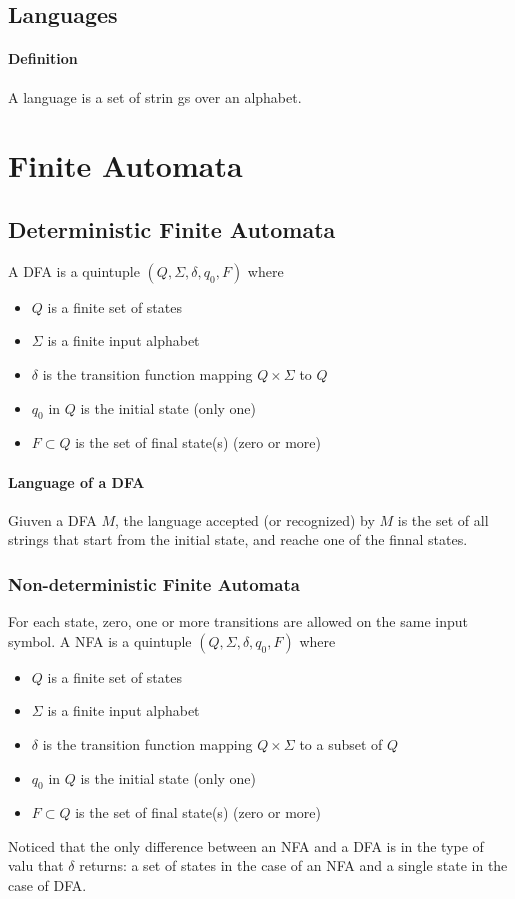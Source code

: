 \documentclass[titlepage]{article}
\begin{document}
        \subsection*{Languages}
            \paragraph{Definition}
            A language is a set of strin gs over an alphabet.
    \section{Finite Automata}
        \subsection*{Deterministic Finite Automata}
            A DFA is a quintuple $(Q,\Sigma,\delta,q_0,F)$ where
            \begin{itemize}
                \item $Q$ is a finite set of states
                \item $\Sigma$ is a finite input alphabet
                \item $\delta$ is the transition function mapping $Q\times \Sigma$ to $Q$
                \item $q_0$ in $Q$ is the initial state (only one)
                \item $F\subset Q$ is the set of final state(s) (zero or more)
            \end{itemize}
            \paragraph{Language of a DFA}
            Giuven a DFA $M$, the language accepted (or recognized) by $M$ is the set of all strings that start from the initial state, and reache one of the finnal states.
        \subsubsection*{Non-deterministic Finite Automata}
            For each state, zero, one or more transitions are allowed on the same input symbol.
            A NFA is a quintuple $(Q,\Sigma,\delta,q_0,F)$ where
            \begin{itemize}
                \item $Q$ is a finite set of states
                \item $\Sigma$ is a finite input alphabet
                \item $\delta$ is the transition function mapping $Q\times \Sigma$ to a subset of $Q$
                \item $q_0$ in $Q$ is the initial state (only one)
                \item $F\subset Q$ is the set of final state(s) (zero or more)
            \end{itemize}
            Noticed that the only difference between an NFA and a DFA is in the type of valu that $\delta$ returns: a set of states in the case of an NFA and a single state in the case of DFA.
\end{document}
